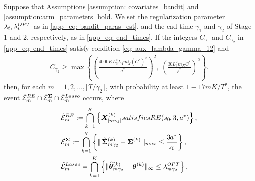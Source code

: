 \documentclass[10pt,a4paper]{amsart}
\newcommand{\bSigma}{\boldsymbol{\Sigma}}
\newcommand{\bX}{\boldsymbol{X}}
\newcommand{\btheta}{\boldsymbol{\theta}}
\newcommand{\hbSigma}{\hat{\boldsymbol{\Sigma}}}
\newcommand{\hbtheta}{\widehat{\boldsymbol{\theta}}}
\newcommand{\hdlambda}{\lambda^{\textup{OPT}}}
\newcommand{\mE}{\mathcal{E}}
\newcommand{\mn}{\vert\kern-0.25ex \vert\kern-0.25ex \vert}
\begin{document}
\begin{lemma}  \label{stage3: main lemma_second}
Suppose that Assumptions \ref{assumption: covariates_bandit} and \ref{assumption:arm_parameters} hold. We set the regularization parameter $\lambda_t,\hdlambda_t$ as in \eqref{app_eq: bandit_paras_est}, and the end time $\gamma_1$ and $\gamma_2$ of Stage 1 and 2, respectively, as in \eqref{app_eq: end_times}.
If the integers $C_{\gamma_1}$ and $C_{\gamma_2}$ in \eqref{app_eq: end_times} satisfy condition \eqref{eq: aux_lambda_gamma_12} and
\begin{align}
    \label{eq: aux_lambda_gamma_12_generalm}
     C_{\gamma_2} \geq \max\left\{\left(\frac{4000KL_3^2L_4 m_X^4(C^*)^2}{a^*}\right)^2, \; \left( \frac{30L_3^2 m_X C^*}{\ell_1^*}\right)^2 \right\}.
\end{align}
then, for each $m = 1,2,\ldots, \lfloor T/\gamma_2 \rfloor$,  with probability at least $1-17mK/T^2$, the event $\tilde{\mE}_m^{\textup{RE}} \cap \tilde{\mE}_m^{\bSigma} \cap  \tilde{\mE}_m^{\textup{Lasso}}$ occurs, where
\begin{align} \label{eq:aux_gamma2_events_generalm}
\begin{split}
&\tilde{\mE}_m^{\textup{RE}} := \bigcap_{k=1}^{K}\left\{\bX_{[m\gamma_2]}^{(k)} \textup{ satisfies } \textup{RE}(s_0, 3, a^*)\right\},\\ 
&\tilde{\mE}_m^{\bSigma} := \bigcap_{k=1}^{K}\left\{\mn\hbSigma_{m\gamma_2}^{(k)}-\bSigma^{(k)}\mn_{\textup{max}} \le  \frac{3 a^*}{s_0} \right\},\\ 
&\tilde{\mE}_m^{\textup{Lasso}} = \bigcap_{k = 1}^{K}\left\{\|\hbtheta_{m\gamma_2}^{(k)} - \btheta^{(k)}\|_{\infty} \leq  \hdlambda_{m\gamma_2}\right\}.
\end{split}
\end{align}
\end{lemma}
\end{document}
